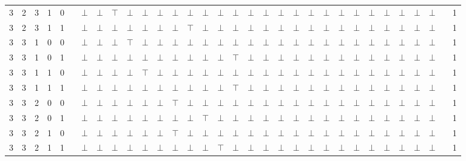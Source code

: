 \documentclass[12pt]{extarticle}
\begin{document}
\begin{landscape}
\begin{tiny}
\begin{longtable}[c]{llllllllllllllllllllllllllllllll}
3 & 2 & 3 & 1 & 0 &  & $\bot$ & $\bot$ & $\top$ & $\bot$ & $\bot$ & $\bot$ & $\bot$ & $\bot$ & $\bot$ & $\bot$ & $\bot$ & $\bot$ & $\bot$ & $\bot$ & $\bot$ & $\bot$ & $\bot$ & $\bot$ & $\bot$ & $\bot$ & $\bot$ & $\bot$ & $\bot$ & $\bot$ &  & 1 \\
3 & 2 & 3 & 1 & 1 &  & $\bot$ & $\bot$ & $\bot$ & $\bot$ & $\bot$ & $\bot$ & $\bot$ & $\top$ & $\bot$ & $\bot$ & $\bot$ & $\bot$ & $\bot$ & $\bot$ & $\bot$ & $\bot$ & $\bot$ & $\bot$ & $\bot$ & $\bot$ & $\bot$ & $\bot$ & $\bot$ & $\bot$ &  & 1 \\
3 & 3 & 1 & 0 & 0 &  & $\bot$ & $\bot$ & $\bot$ & $\top$ & $\bot$ & $\bot$ & $\bot$ & $\bot$ & $\bot$ & $\bot$ & $\bot$ & $\bot$ & $\bot$ & $\bot$ & $\bot$ & $\bot$ & $\bot$ & $\bot$ & $\bot$ & $\bot$ & $\bot$ & $\bot$ & $\bot$ & $\bot$ &  & 1 \\
3 & 3 & 1 & 0 & 1 &  & $\bot$ & $\bot$ & $\bot$ & $\bot$ & $\bot$ & $\bot$ & $\bot$ & $\bot$ & $\bot$ & $\bot$ & $\top$ & $\bot$ & $\bot$ & $\bot$ & $\bot$ & $\bot$ & $\bot$ & $\bot$ & $\bot$ & $\bot$ & $\bot$ & $\bot$ & $\bot$ & $\bot$ &  & 1 \\
3 & 3 & 1 & 1 & 0 &  & $\bot$ & $\bot$ & $\bot$ & $\bot$ & $\top$ & $\bot$ & $\bot$ & $\bot$ & $\bot$ & $\bot$ & $\bot$ & $\bot$ & $\bot$ & $\bot$ & $\bot$ & $\bot$ & $\bot$ & $\bot$ & $\bot$ & $\bot$ & $\bot$ & $\bot$ & $\bot$ & $\bot$ &  & 1 \\
3 & 3 & 1 & 1 & 1 &  & $\bot$ & $\bot$ & $\bot$ & $\bot$ & $\bot$ & $\bot$ & $\bot$ & $\bot$ & $\bot$ & $\bot$ & $\top$ & $\bot$ & $\bot$ & $\bot$ & $\bot$ & $\bot$ & $\bot$ & $\bot$ & $\bot$ & $\bot$ & $\bot$ & $\bot$ & $\bot$ & $\bot$ &  & 1 \\
3 & 3 & 2 & 0 & 0 &  & $\bot$ & $\bot$ & $\bot$ & $\bot$ & $\bot$ & $\bot$ & $\top$ & $\bot$ & $\bot$ & $\bot$ & $\bot$ & $\bot$ & $\bot$ & $\bot$ & $\bot$ & $\bot$ & $\bot$ & $\bot$ & $\bot$ & $\bot$ & $\bot$ & $\bot$ & $\bot$ & $\bot$ &  & 1 \\
3 & 3 & 2 & 0 & 1 &  & $\bot$ & $\bot$ & $\bot$ & $\bot$ & $\bot$ & $\bot$ & $\bot$ & $\bot$ & $\top$ & $\bot$ & $\bot$ & $\bot$ & $\bot$ & $\bot$ & $\bot$ & $\bot$ & $\bot$ & $\bot$ & $\bot$ & $\bot$ & $\bot$ & $\bot$ & $\bot$ & $\bot$ &  & 1 \\
3 & 3 & 2 & 1 & 0 &  & $\bot$ & $\bot$ & $\bot$ & $\bot$ & $\bot$ & $\bot$ & $\top$ & $\bot$ & $\bot$ & $\bot$ & $\bot$ & $\bot$ & $\bot$ & $\bot$ & $\bot$ & $\bot$ & $\bot$ & $\bot$ & $\bot$ & $\bot$ & $\bot$ & $\bot$ & $\bot$ & $\bot$ &  & 1 \\
3 & 3 & 2 & 1 & 1 &  & $\bot$ & $\bot$ & $\bot$ & $\bot$ & $\bot$ & $\bot$ & $\bot$ & $\bot$ & $\bot$ & $\top$ & $\bot$ & $\bot$ & $\bot$ & $\bot$ & $\bot$ & $\bot$ & $\bot$ & $\bot$ & $\bot$ & $\bot$ & $\bot$ & $\bot$ & $\bot$ & $\bot$ &  & 1 \\

\end{longtable}
\end{tiny}
\end{landscape}
\end{document}

